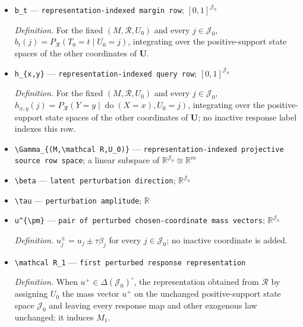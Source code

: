 \documentclass{article}
\begin{document}
\begin{itemize}
  \par\smallskip\noindent\emph{Definition.} For every \(j\in\mathcal J_0\), \(a_+(j)=\sum_{v\in\mathcal X_V}a_v(j)=P_{\mathcal R}(S=1\mid U_0=j)\).
  \item \texttt{b\_\allowbreak{}t} --- \texttt{representation-\allowbreak{}indexed margin row}; \([0,1]^{\mathcal J_0}\)
  \par\smallskip\noindent\emph{Definition.} For the fixed \((M,\mathcal R,U_0)\) and every \(j\in\mathcal J_0\), \(b_t(j)=P_{\mathcal R}(T_0=t\mid U_0=j)\), integrating over the positive-support state spaces of the other coordinates of \(\mathbf U\).
  \item \texttt{h\_\allowbreak{}\{x,\allowbreak{}y\}\allowbreak{}} --- \texttt{representation-\allowbreak{}indexed query row}; \([0,1]^{\mathcal J_0}\)
  \par\smallskip\noindent\emph{Definition.} For the fixed \((M,\mathcal R,U_0)\) and every \(j\in\mathcal J_0\), \(h_{x,y}(j)=P_{\mathcal R}(Y=y\mid\operatorname{do}(X=x),U_0=j)\), integrating over the positive-support state spaces of the other coordinates of \(\mathbf U\); no inactive response label indexes this row.
  \item \texttt{\textbackslash{}\allowbreak{}Gamma\_\allowbreak{}\{(M,\allowbreak{}\textbackslash{}\allowbreak{}mathcal R,\allowbreak{}U\_\allowbreak{}0)\}\allowbreak{}} --- \texttt{representation-\allowbreak{}indexed projective source row space}; a linear subspace of \(\mathbb R^{\mathcal J_0}\cong\mathbb R^m\)
  \item \texttt{\textbackslash{}\allowbreak{}beta} --- \texttt{latent perturbation direction}; \(\mathbb R^{\mathcal J_0}\)
  \item \texttt{\textbackslash{}\allowbreak{}tau} --- \texttt{perturbation amplitude}; \(\mathbb R\)
  \item \texttt{u\textasciicircum{}\{\textbackslash{}\allowbreak{}pm\}\allowbreak{}} --- \texttt{pair of perturbed chosen-\allowbreak{}coordinate mass vectors}; \(\mathbb R^{\mathcal J_0}\)
  \par\smallskip\noindent\emph{Definition.} \(u^{\pm}_j=u_j\pm\tau\beta_j\) for every \(j\in\mathcal J_0\); no inactive coordinate is added.
  \item \texttt{\textbackslash{}\allowbreak{}mathcal R\_\allowbreak{}1} --- \texttt{first perturbed response representation}
  \par\smallskip\noindent\emph{Definition.} When \(u^+\in\Delta(\mathcal J_0)^{\circ}\), the representation obtained from \(\mathcal R\) by assigning \(U_0\) the mass vector \(u^+\) on the unchanged positive-support state space \(\mathcal J_0\) and leaving every response map and other exogenous law unchanged; it induces \(M_1\).

\end{itemize}
\end{document}
